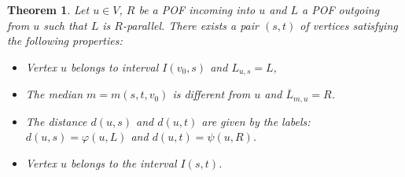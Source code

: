 \documentclass{article}
\newtheorem{theorem}{Theorem}
\begin{document}
\begin{theorem}
Let $u \in V$, $R$ be a POF incoming into $u$ and $L$ a POF outgoing from $u$ such that $L$ is $R$-parallel. There exists a pair $(s,t)$ of vertices satisfying the following properties:
\begin{itemize}
    \item Vertex $u$ belongs to interval $I(v_0,s)$ and $L_{u,s} = L$,
    \item The median $m = m(s,t,v_0)$ is different from $u$ and $\overline{L}_{m,u} = R$.
    \item The distance $d(u,s)$ and $d(u,t)$ are given by the labels: $d(u,s) = \varphi(u,L)$ and $d(u,t) = \psi(u,R)$.
    \item Vertex $u$ belongs to the interval $I(s,t)$.
\end{itemize}
\label{th:psi_plus_phi}
\end{theorem}
\end{document}

